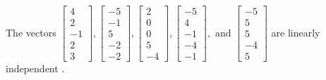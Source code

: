 \begin{exercise}
\begin{exerciseStatement}
  \end{exerciseStatement}
  \begin{exerciseAnswer}
   The vectors \(\left[\begin{array}{r}
4 \\
2 \\
-1 \\
2 \\
3
\end{array}\right] , \left[\begin{array}{r}
-5 \\
-1 \\
5 \\
-2 \\
-2
\end{array}\right] , \left[\begin{array}{r}
2 \\
0 \\
0 \\
5 \\
-4
\end{array}\right] , \left[\begin{array}{r}
-5 \\
4 \\
-1 \\
-4 \\
-1
\end{array}\right] , \text{ and } \left[\begin{array}{r}
-5 \\
5 \\
5 \\
-4 \\
5
\end{array}\right]\) are 
  	 linearly independent  .
  


  \end{exerciseAnswer}
\end{exercise}